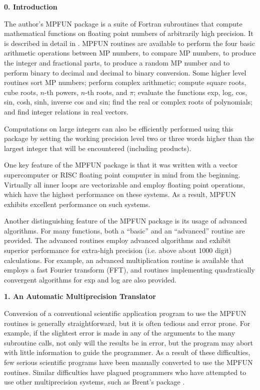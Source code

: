 \newpage

\noindent
{\bf 0. Introduction}

The author's MPFUN package is a suite of Fortran subroutines that
compute mathematical functions on floating point numbers of
arbitrarily high precision.  It is described in detail in \cite{dhb1}.
MPFUN routines are available to perform the four basic arithmetic
operations between MP numbers, to compare MP numbers, to produce the
integer and fractional parts, to produce a random MP number and to
perform binary to decimal and decimal to binary conversion.  Some
higher level routines sort MP numbers; perform complex arithmetic;
compute square roots, cube roots, $n$-th powers, $n$-th roots, and
$\pi$; evaluate the functions exp, log, cos, sin, cosh, sinh, inverse
cos and sin; find the real or complex roots of polynomials; and find
integer relations in real vectors.

Computations on large integers can also be efficiently performed using
this package by setting the working precision level two or three words
higher than the largest integer that will be encountered (including
products).

One key feature of the MPFUN package is that it was written with a
vector supercomputer or RISC floating point computer in mind from the
beginning.  Virtually all inner loops are vectorizable and employ
floating point operations, which have the highest performance on these
systems.  As a result, MPFUN exhibits excellent performance on such
systems.

Another distinguishing feature of the MPFUN package is its usage of
advanced algorithms.  For many functions, both a ``basic'' and an
``advanced'' routine are provided.  The advanced routines employ
advanced algorithms and exhibit superior performance for extra-high
precision (i.e. above about 1000 digit) calculations.  For example, an
advanced multiplication routine is available that employs a fast
Fourier transform (FFT), and routines implementing quadratically
convergent algorithms for exp and log are also provided.

\vspace{2ex} \noindent
{\bf 1. An Automatic Multiprecision Translator}

Conversion of a conventional scientific application program to use the
MPFUN routines is generally straightforward, but it is often tedious
and error prone.  For example, if the slightest error is made in any
of the arguments to the many subroutine calls, not only will the
results be in error, but the program may abort with little information
to guide the programmer.  As a result of these difficulties, few
serious scientific programs have been manually converted to use the
MPFUN routines.  Similar difficulties have plagued programmers who
have attempted to use other multiprecision systems, such as Brent's
package \cite{brent}.

